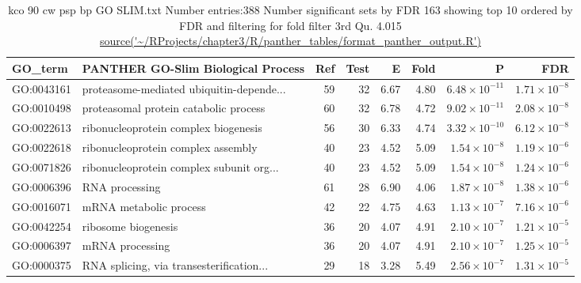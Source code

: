 \begin{table}[ht]
\centering
\begin{adjustbox}{width=\textwidth}

\begin{tabular}{llrrrrrr}
  \hline
GO\_term & PANTHER GO-Slim Biological Process & Ref & Test & E & Fold & P & FDR \\ 
  \hline
GO:0043161 & proteasome-mediated ubiquitin-depende... & 59 & 32 & 6.67 & 4.80 & $6.48 \times 10^{-11}$ & $1.71 \times 10^{-8}$ \\ 
  GO:0010498 & proteasomal protein catabolic process  & 60 & 32 & 6.78 & 4.72 & $9.02 \times 10^{-11}$ & $2.08 \times 10^{-8}$ \\ 
  GO:0022613 & ribonucleoprotein complex biogenesis  & 56 & 30 & 6.33 & 4.74 & $3.32 \times 10^{-10}$ & $6.12 \times 10^{-8}$ \\ 
  GO:0022618 & ribonucleoprotein complex assembly  & 40 & 23 & 4.52 & 5.09 & $1.54 \times 10^{-8}$ & $1.19 \times 10^{-6}$ \\ 
  GO:0071826 & ribonucleoprotein complex subunit org... & 40 & 23 & 4.52 & 5.09 & $1.54 \times 10^{-8}$ & $1.24 \times 10^{-6}$ \\ 
  GO:0006396 & RNA processing  & 61 & 28 & 6.90 & 4.06 & $1.87 \times 10^{-8}$ & $1.38 \times 10^{-6}$ \\ 
  GO:0016071 & mRNA metabolic process  & 42 & 22 & 4.75 & 4.63 & $1.13 \times 10^{-7}$ & $7.16 \times 10^{-6}$ \\ 
  GO:0042254 & ribosome biogenesis  & 36 & 20 & 4.07 & 4.91 & $2.10 \times 10^{-7}$ & $1.21 \times 10^{-5}$ \\ 
  GO:0006397 & mRNA processing  & 36 & 20 & 4.07 & 4.91 & $2.10 \times 10^{-7}$ & $1.25 \times 10^{-5}$ \\ 
  GO:0000375 & RNA splicing, via transesterification... & 29 & 18 & 3.28 & 5.49 & $2.56 \times 10^{-7}$ & $1.31 \times 10^{-5}$ \\ 
  \hline
\end{tabular}
\end{adjustbox}
\caption{kco 90 cw psp bp GO SLIM.txt Number entries:388 Number significant sets by FDR 163 showing top 10 ordered by FDR and filtering for fold filter 3rd Qu. 4.015 \url{source('~/RProjects/chapter3/R/panther_tables/format_panther_output.R')}} 
\label{tab:kco 90 cw psp bp GO SLIM.txt Number entries:388 Number significant sets by FDR 163 showing top 10 ordered by FDR and filtering for fold filter 3rd Qu. 4.015}
\end{table}


